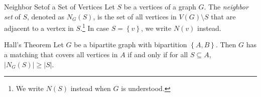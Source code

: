 \documentclass[co342]{subfiles}
\begin{document}
    \begin{definition}{Neighbor Set}{of a Set of Vertices}
        Let $S$ be a vertices of a graph $G$. The \emph{neighbor set} of $S$, denoted as $N_G\left( S \right)$, is the set of all vertices in $V\left( G \right)\setminus S$ that are adjacent to a vertex in $S$.\footnote{We write $N\left( S \right)$ instead when $G$ is understood.} In case $S=\left\lbrace v \right\rbrace$, we write $N\left( v \right)$ instead.
    \end{definition}

    \begin{theorem}{Hall's Theorem}
        Let $G$ be a bipartite graph with bipartition $\left\lbrace A,B \right\rbrace$. Then $G$ has a matching that covers all vertices in $A$ if and only if for all $S\subseteq A$, $\left| N_G\left( S \right) \right|\geq\left| S \right|$.
    \end{theorem}
\end{document}

